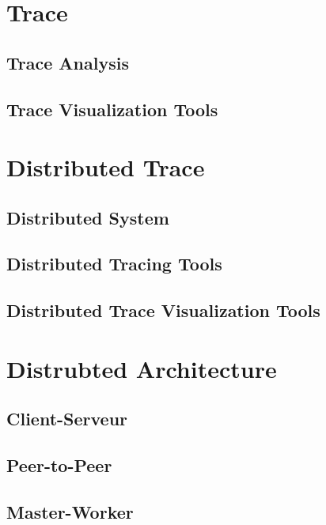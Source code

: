\label{sec:RevLitt}

\section{Trace}

\subsection{Trace Analysis}

\subsection{Trace Visualization Tools}


\section{Distributed Trace}

\subsection{Distributed System}

\subsection{Distributed Tracing Tools}

\subsection{Distributed Trace Visualization Tools}


\section{Distrubted Architecture}

\subsection{Client-Serveur}

\subsection{Peer-to-Peer} 

\subsection{Master-Worker}


